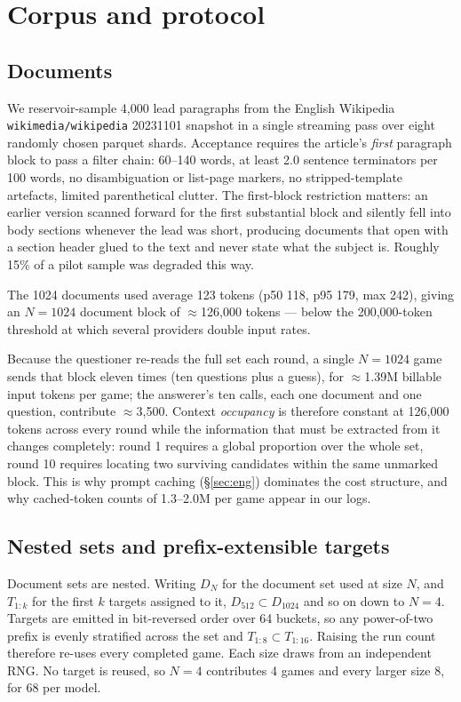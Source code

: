 \documentclass[11pt]{article}
\begin{document}
\section{Corpus and protocol}

\subsection{Documents}

We reservoir-sample 4{,}000 lead paragraphs from the English Wikipedia
\texttt{wikimedia/wikipedia} 20231101 snapshot in a single streaming pass over
eight randomly chosen parquet shards. Acceptance requires the article's
\emph{first} paragraph block to pass a filter chain: 60--140 words, at least 2.0
sentence terminators per 100 words, no disambiguation or list-page markers, no
stripped-template artefacts, limited parenthetical clutter. The first-block
restriction matters: an earlier version scanned forward for the first
substantial block and silently fell into body sections whenever the lead was
short, producing documents that open with a section header glued to the text and
never state what the subject is. Roughly 15\% of a pilot sample was degraded
this way.

The 1024 documents used average 123 tokens (p50 118, p95 179, max 242), giving
an $N{=}1024$ document block of $\approx$126{,}000 tokens --- below the
200{,}000-token threshold at which several providers double input rates.

Because the questioner re-reads the full set each round, a single $N{=}1024$
game sends that block eleven times (ten questions plus a guess), for
$\approx$1.39M billable input tokens per game; the answerer's ten calls, each
one document and one question, contribute $\approx$3{,}500. Context
\emph{occupancy} is therefore constant at 126{,}000 tokens across every round
while the information that must be extracted from it changes completely: round
1 requires a global proportion over the whole set, round 10 requires locating
two surviving candidates within the same unmarked block. This is why prompt
caching (\S\ref{sec:eng}) dominates the cost structure, and why cached-token
counts of 1.3--2.0M per game appear in our logs.

\subsection{Nested sets and prefix-extensible targets}

Document sets are nested. Writing $D_N$ for the document set used at size $N$,
and $T_{1:k}$ for the first $k$ targets assigned to it, $D_{512} \subset
D_{1024}$ and so on down to $N=4$. Targets are emitted in bit-reversed order
over 64 buckets, so any power-of-two prefix is evenly stratified across the set
and $T_{1:8} \subset T_{1:16}$. Raising the run count therefore re-uses every
completed game. Each size draws from an independent
RNG. No target is reused, so $N=4$ contributes 4 games and every larger size 8,
for 68 per model.
\end{document}
